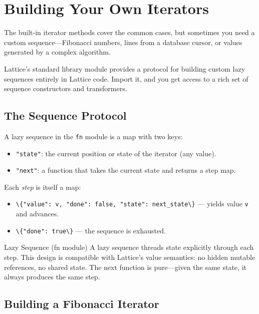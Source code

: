 \section{Building Your Own Iterators}\label{sec:custom-iterators}

The built-in iterator methods cover the common cases, but sometimes you need a custom sequence---Fibonacci numbers, lines from a database cursor, or values generated by a complex algorithm.

Lattice's  standard library module provides a protocol for building custom lazy sequences entirely in Lattice code.
Import it, and you get access to a rich set of sequence constructors and transformers.

\subsection{The Sequence Protocol}\label{subsec:seq-protocol}

A lazy sequence in the \lstinline|fn| module is a map with two keys:
\begin{itemize}[nosep]
  \item \lstinline|"state"|: the current position or state of the iterator (any value).
  \item \lstinline|"next"|: a function that takes the current state and returns a step map.
\end{itemize}

Each \emph{step} is itself a map:
\begin{itemize}[nosep]
  \item \lstinline|\{"value": v, "done": false, "state": next_state\}| --- yields value \lstinline|v| and advances.
  \item \lstinline|\{"done": true\}| --- the sequence is exhausted.
\end{itemize}

\begin{defnbox}{Lazy Sequence (fn module)}
A lazy sequence threads state explicitly through each step.
This design is compatible with Lattice's value semantics: no hidden mutable references, no shared state.
The next function is pure---given the same state, it always produces the same step.
\end{defnbox}

\subsection{Building a Fibonacci Iterator}\label{subsec:fibonacci-iter}


